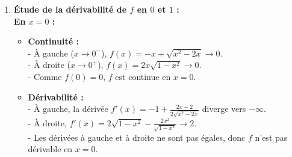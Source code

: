 \documentclass{article}
\begin{document}
\begin{enumerate}
    \textbf{Quand \( x \to 0^+ \) :} \\
    Pour \( x > 0 \), \( f(x) = 2x\sqrt{1 - x^2} \). \\
    Quand \( x \to 0^+ \), \( \sqrt{1 - x^2} \to \sqrt{1} = 1 \), donc :
    \[
    f(x) \to 2x \to 0.
    \]

    \textbf{Quand \( x \to 1^- \) :} \\
    Pour \( x > 0 \), \( f(x) = 2x\sqrt{1 - x^2} \). \\
    Quand \( x \to 1^- \), \( 1 - x^2 \to 0^+ \), donc \( \sqrt{1 - x^2} \to 0^+ \). \\
    Par conséquent :
    \[
    f(x) = 2x\sqrt{1 - x^2} \to 0.
    \]
   
    \textbf{Asymptotes et branches infinies éventuelles} \\

    \textbf{Pour \( x \to -\infty \) :} \\
    On a montré que \( f(x) \sim -2x \). \\
    Ainsi, \( f(x) \) admet une \textbf{branche infinie oblique} d'équation asymptotique :
    \[
    y = -2x \quad \text{pour } x \to -\infty.
    \]
    
    \item \textbf{Étude de la dérivabilité de \( f \) en \( 0 \) et \( 1 \) :} \\

    \textbf{En \( x = 0 \) :}
    \begin{itemize}
        \item \textbf{Continuité :} \\
        - À gauche (\( x \to 0^- \)), \( f(x) = -x + \sqrt{x^2 - 2x} \to 0 \). \\
        - À droite (\( x \to 0^+ \)), \( f(x) = 2x\sqrt{1 - x^2} \to 0 \). \\
        - Comme \( f(0) = 0 \), \( f \) est continue en \( x = 0 \).

        \item \textbf{Dérivabilité :} \\
        - À gauche, la dérivée \( f'(x) = -1 + \frac{2x - 2}{2\sqrt{x^2 - 2x}} \) diverge vers \(-\infty\). \\
        - À droite, \( f'(x) = 2\sqrt{1 - x^2} - \frac{2x^2}{\sqrt{1 - x^2}} \to 2 \). \\
        - Les dérivées à gauche et à droite ne sont pas égales, donc \( f \) n'est pas dérivable en \( x = 0 \).
    \end{itemize}


\end{enumerate}
\end{document}
